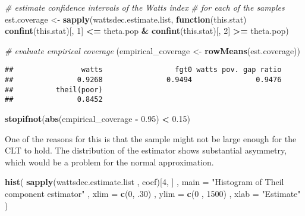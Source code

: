 \documentclass[
]{book}
\newenvironment{Shaded}{\begin{snugshade}}{\end{snugshade}}
\newcommand{\AttributeTok}[1]{\textcolor[rgb]{0.13,0.29,0.53}{#1}}
\newcommand{\CommentTok}[1]{\textcolor[rgb]{0.56,0.35,0.01}{\textit{#1}}}
\newcommand{\ControlFlowTok}[1]{\textcolor[rgb]{0.13,0.29,0.53}{\textbf{#1}}}
\newcommand{\DecValTok}[1]{\textcolor[rgb]{0.00,0.00,0.81}{#1}}
\newcommand{\FloatTok}[1]{\textcolor[rgb]{0.00,0.00,0.81}{#1}}
\newcommand{\FunctionTok}[1]{\textcolor[rgb]{0.13,0.29,0.53}{\textbf{#1}}}
\newcommand{\NormalTok}[1]{#1}
\newcommand{\OtherTok}[1]{\textcolor[rgb]{0.56,0.35,0.01}{#1}}
\newcommand{\SpecialCharTok}[1]{\textcolor[rgb]{0.81,0.36,0.00}{\textbf{#1}}}
\newcommand{\StringTok}[1]{\textcolor[rgb]{0.31,0.60,0.02}{#1}}
\begin{document}
\begin{Shaded}
\begin{Highlighting}[]
\CommentTok{\# estimate confidence intervals of the Watts index}
\CommentTok{\# for each of the samples}
\NormalTok{est.coverage }\OtherTok{\textless{}{-}}
  \FunctionTok{sapply}\NormalTok{(wattsdec.estimate.list, }\ControlFlowTok{function}\NormalTok{(this.stat)}
    \FunctionTok{confint}\NormalTok{(this.stat)[, }\DecValTok{1}\NormalTok{] }\SpecialCharTok{\textless{}=}\NormalTok{ theta.pop }\SpecialCharTok{\&}
      \FunctionTok{confint}\NormalTok{(this.stat)[, }\DecValTok{2}\NormalTok{] }\SpecialCharTok{\textgreater{}=}\NormalTok{ theta.pop)}

\CommentTok{\# evaluate empirical coverage}
\NormalTok{(empirical\_coverage }\OtherTok{\textless{}{-}} \FunctionTok{rowMeans}\NormalTok{(est.coverage))}
\end{Highlighting}
\end{Shaded}

\begin{verbatim}
##                watts                 fgt0 watts pov. gap ratio 
##               0.9268               0.9494               0.9476 
##          theil(poor) 
##               0.8452
\end{verbatim}

\begin{Shaded}
\begin{Highlighting}[]
\FunctionTok{stopifnot}\NormalTok{(}\FunctionTok{abs}\NormalTok{(empirical\_coverage }\SpecialCharTok{{-}} \FloatTok{0.95}\NormalTok{) }\SpecialCharTok{\textless{}} \FloatTok{0.15}\NormalTok{)}
\end{Highlighting}
\end{Shaded}

One of the reasons for this is that the sample might not be large enough for the CLT to hold. The distribution of the estimator shows substantial asymmetry, which would be a problem for the normal approximation.

\begin{Shaded}
\begin{Highlighting}[]
\FunctionTok{hist}\NormalTok{(}
  \FunctionTok{sapply}\NormalTok{(wattsdec.estimate.list , coef)[}\DecValTok{4}\NormalTok{, ] ,}
  \AttributeTok{main =} \StringTok{"Histogram of Theil component estimator"}\NormalTok{ ,}
  \AttributeTok{xlim =} \FunctionTok{c}\NormalTok{(}\DecValTok{0}\NormalTok{, .}\DecValTok{30}\NormalTok{) ,}
  \AttributeTok{ylim =} \FunctionTok{c}\NormalTok{(}\DecValTok{0}\NormalTok{ , }\DecValTok{1500}\NormalTok{) ,}
  \AttributeTok{xlab =} \StringTok{"Estimate"}
\NormalTok{)}
\end{Highlighting}
\end{Shaded}
\end{document}
